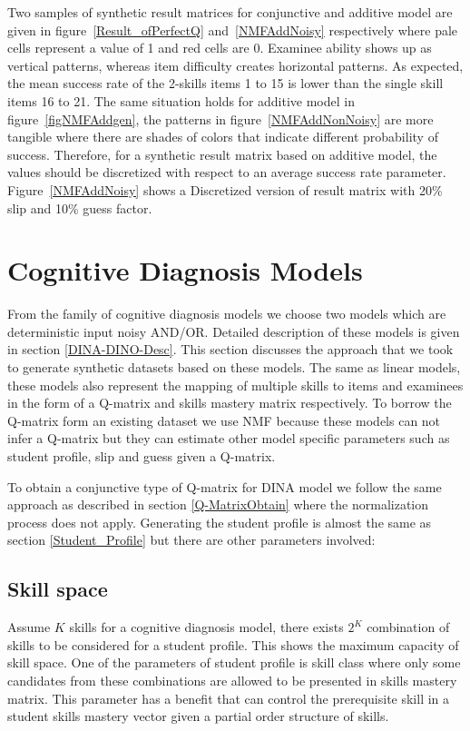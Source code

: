 Two samples of synthetic result matrices for conjunctive and additive model are given in figure~\ref{Result_ofPerfectQ} and~\ref{NMFAddNoisy} respectively where pale cells represent a value of 1 and red cells are 0. Examinee ability shows up as vertical patterns, whereas item difficulty creates horizontal patterns. As expected, the mean success rate of the 2-skills items 1 to 15 is lower than the single skill items 16 to 21. The same situation holds for additive model in figure~\ref{figNMFAddgen}, the patterns in figure~\ref{NMFAddNonNoisy} are more tangible where there are shades of colors that indicate different probability of success. Therefore, for a synthetic result matrix based on additive model, the values should be discretized with respect to an average success rate parameter. Figure~\ref{NMFAddNoisy} shows a Discretized version of result matrix with 20\% slip and 10\% guess factor.


\section{Cognitive Diagnosis Models}
\label{Syn:DINAO}

From the family of cognitive diagnosis models we choose two models which are deterministic input noisy AND/OR. Detailed description of these models is given in section \ref{DINA-DINO-Desc}. This section discusses the approach that we took to generate synthetic datasets based on these models. The same as linear models, these models also represent the mapping of multiple skills to items and examinees in the form of a Q-matrix and skills mastery matrix respectively. To borrow the Q-matrix form an existing dataset we use NMF because these models can not infer a Q-matrix but they can estimate other model specific parameters such as student profile, slip and guess given a Q-matrix. 

To obtain a conjunctive type of Q-matrix for DINA model we follow the same approach as described in section \ref{Q-MatrixObtain} where the normalization process does not apply.  Generating the student profile is almost the same as section \ref{Student_Profile} but there are other parameters involved:


\subsection{Skill space}
Assume $K$ skills for a cognitive diagnosis model, there exists $2^K$ combination of skills to be considered for a student profile. This shows the maximum capacity of skill space. One of the parameters of student profile is skill class where only some candidates from these combinations are allowed to be presented in skills mastery matrix. This parameter has a benefit that can control the prerequisite skill in a student skills mastery vector given a partial order structure of skills.

